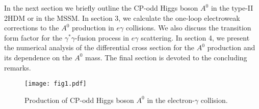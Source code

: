 \documentclass[final,5p,times,twocolumn]{elsarticle}
\begin{document}
In the next section we briefly 
outline the CP-odd Higgs boson $A^0$
in the type-II 2HDM or in the MSSM. In section 3, we calculate the one-loop 
electroweak corrections to the $A^0$ production in $e\gamma$ collisions. 
We also discuss the transition form factor for the $\gamma^*\gamma$-fusion 
process in $e\gamma$ scattering. In section 4, we present the numerical 
analysis of the differential cross section for the $A^0$ production
and its dependence on the $A^0$ mass.
The final section is devoted to the concluding remarks. 

\begin{figure}[hbt]
\begin{center}
\texttt{[image: fig1.pdf]}
\caption{\label{e-gamma-collision-A-blob} 
Production of CP-odd Higgs boson $A^0$ 
in the electron-$\gamma$ collision.
} 
\end{center}
\end{figure}

\vspace{-0.5cm}

\end{document}
